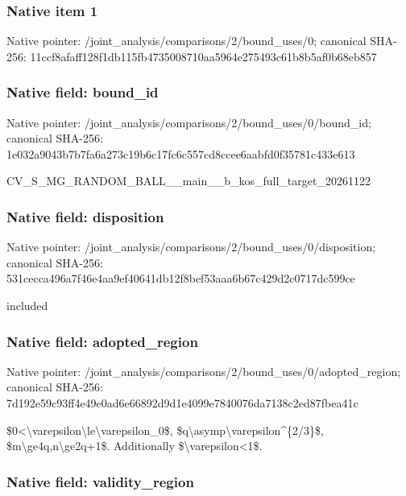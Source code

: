 \documentclass[10pt,a4paper]{article}
\begin{document}
\subsubsection{Native item 1}


Native pointer: /joint\_analysis/comparis\allowbreak{}ons/2/bound\_uses/0; canonical SHA-256: 11ccf8afaff128f1db115fb4\allowbreak{}735008710aa5964e275493c6\allowbreak{}1b8b5af0b68eb857



\subsubsection{Native field: bound\_id}


Native pointer: /joint\_analysis/comparis\allowbreak{}ons/2/bound\_uses/0/bound\allowbreak{}\_id; canonical SHA-256: 1e032a9043b7b7fa6a273c19\allowbreak{}b6c17fc6c557cd8ccee6aabf\allowbreak{}d0f35781c433e613


CV\_S\_MG\_RANDOM\_BALL\_\_mai\allowbreak{}n\_\_b\_kos\_full\_target\_202\allowbreak{}61122


\subsubsection{Native field: disposition}


Native pointer: /joint\_analysis/comparis\allowbreak{}ons/2/bound\_uses/0/dispo\allowbreak{}sition; canonical SHA-256: 531cecca496a7f46e4aa9ef4\allowbreak{}0641db12f8bef53aaa6b67c4\allowbreak{}29d2c0717dc599ce


included


\subsubsection{Native field: adopted\_region}


Native pointer: /joint\_analysis/comparis\allowbreak{}ons/2/bound\_uses/0/adopt\allowbreak{}ed\_region; canonical SHA-256: 7d192e59c93ff4e49e0ad6e6\allowbreak{}6892d9d1e4099e7840076da7\allowbreak{}138c2ed87fbea41c


\$0<\textbackslash{}varepsilon\textbackslash{}le\textbackslash{}varepsilon\_0\$, \$q\textbackslash{}asymp\textbackslash{}varepsilon\textasciicircum{}\{2/3\}\$, \$m\textbackslash{}ge4q,n\textbackslash{}ge2q+1\$. Additionally \$\textbackslash{}varepsilon<1\$.


\subsubsection{Native field: validity\_region}
\end{document}
